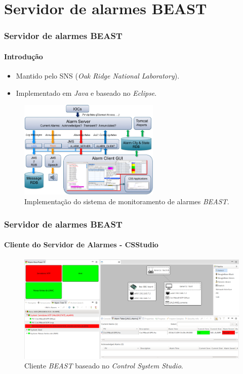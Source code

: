 
\section {Servidor de alarmes BEAST}

\begin{frame}
\frametitle{Servidor de alarmes BEAST}
\framesubtitle{Introdução}
\begin{itemize}
  \item Mantido pelo SNS (\textit{Oak Ridge National Laboratory}).
  \item Implementado em \textit{Java} e baseado no \textit{Eclipse}.
\end{itemize}

\begin{figure}[h]

\centering
\includegraphics[width=0.6\textwidth]{image/beast-arquitetura}
\caption {Implementação do sistema de monitoramento de alarmes
\textit{BEAST}.}
\label{fig:best_arquitetura}
\end{figure}

\end{frame}


\begin{frame}
\frametitle{Servidor de alarmes BEAST}
\framesubtitle{Cliente do Servidor de Alarmes - CSStudio}
\begin{figure}[h]
\centering
\includegraphics[width=\textwidth]{image/beast-screen-shot}
\caption {Cliente \textit{BEAST} baseado no \textit{Control System Studio}.}
\label{fig:alarm}
\end{figure}

\end{frame}

